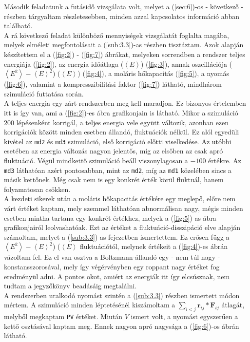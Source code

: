 \begin{multicols}{2}
Második feladatunk a futásidő vizsgálata volt, melyet a (\ref{sec:6})-os - következő - részben tárgyaltam részletesebben, minden azzal kapcsolatos információ abban található. \\
A rá következő feladat különböző mennyiségek vizsgálatát foglalta magába, melyek elméleti megfontolásait a (\ref{sub:3.3})-as részben tisztáztam. Azok alapján készítettem el a (\ref{fig:2}) - (\ref{fig:7}) ábrákat, melyeken sorrendben a rendszer teljes energiája (\ref{fig:2}), az energia időátlaga ($\left< E \right>$) (\ref{fig:3}), annak oszcillációja ($\left< E^{2} \right> - \left< E \right>^{2}$) ($\left< E \right>$) (\ref{fig:4}), a moláris hőkapacitás (\ref{fig:5}), a nyomás (\ref{fig:6}), valamint a kompresszibilitási faktor (\ref{fig:7}) látható, mindhárom szimuláció futtatása során. \\
A teljes energia egy zárt rendszerben meg kell maradjon. Ez bizonyos értelemben itt is így van, ami a (\ref{fig:2})-es ábra grafikonjain is látható. Mikor a szimuláció $200$ lépésenként korrigál, a teljes energia vele együtt változik, azonban ezen korrigációk között minden esetben állandó, fluktuációk nélkül. Ez alól egyedüli kivétel az \texttt{md2} és \texttt{md3} szimuláció, első korrigáció előtti viselkedése. Az utóbbi esetében az energia változás nagyon jelentős, míg az elsőben az csak apró fluktuáció. Végül mindkettő szimuláció beáll viszonylagosan a $-100$ értékre. Az \texttt{md3} láthatóan azért pontosabban, mint az \texttt{md2}, míg az \texttt{md1} közelében sincs a másik kettőnek. Még csak nem is egy konkrét érték körül fluktuál, hanem folyamatosan csökken. \\
A kezdeti sikerek után a moláris hőkapacitás értékére egy meglepő, előre nem várt értéket kaptam, mely szemmel láthatóan abnormálisan nagy, mégis minden esetben mintha tartana egy konkrét értékhez, melyek a (\ref{fig:5})-as ábra grafikonjairól leolvashatóak. Ezt az értéket a fluktuáció-disszipáció elve alapján számoltam, melyet a (\ref{sub:3.3})-as fejezetben ismertettem. Ez erősen függ a $\left< E^{2} \right> - \left< E \right>^{2}$) ($\left< E \right>$ fluktuációtól, melynek értékeit a (\ref{fig:4})-es ábrán vázoltam fel. Ez el van osztva a Boltzmann-állandó egy - nem túl nagy - konstansszorosával, mely így végérvényben egy roppant nagy értéket fog eredményül adni. A pontos okot, amiért az energiák itt így elcsúsznak, nem tudtam a jegyzőkönyv beadásáig megtalálni. \\
A rendszerben uralkodó nyomást szintén a (\ref{sub:3.3}) részben ismertett módon mértem. A szimuláció minden léptetésénél kiszámoltam a $\sum_{i < j} \boldsymbol{r}_{ij} * \boldsymbol{F}_{ij}$ átlagát, melyből megkaptam \texttt{PV} értéket. Miután $V$ ismert volt, a nyomást egyszerűen a kettő osztásával kaptam meg. Ennek nagyon apró nagysága a (\ref{fig:6})-os ábrán látható. \\

\end{multicols}
